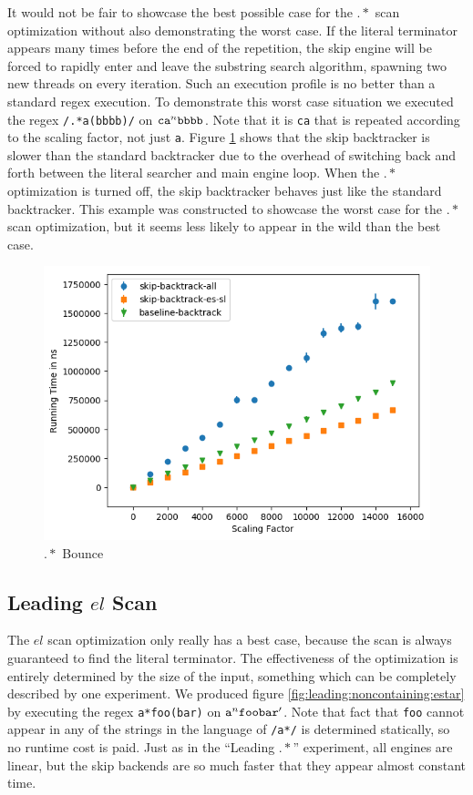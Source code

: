 It would not be fair to showcase the best possible case for the
$.*$ scan optimization without also demonstrating the worst
case. If the literal terminator appears many times before the
end of the repetition, the skip engine will be forced to
rapidly enter and leave the substring search algorithm, spawning
two new threads on every iteration. Such an execution profile
is no better than a standard regex execution.
To demonstrate this worst case situation we executed
the regex \verb'/.*a(bbbb)/' on ${\tt ca}^n{\tt bbbb}$. Note
that it is \verb'ca' that is repeated according to the scaling factor,
not just \verb'a'. Figure \ref{fig:dotstar:bounce}
shows that the skip backtracker is slower than the standard
backtracker due to the overhead of switching back and forth between the
literal searcher and main engine loop. When the $.*$ optimization is
turned off, the skip backtracker behaves just like the standard
backtracker. This example was constructed to showcase the worst
case for the $.*$ scan optimization, but it seems less likely to appear
in the wild than the best case.

\begin{figure}
\caption{$.*$ Bounce}
\label{fig:dotstar:bounce}

\includegraphics{resources/dotstar-bounce.png}
\end{figure}

\subsection{Leading $el$ Scan}

The $el$ scan optimization only really has a best case, because
the scan is always guaranteed to find the literal terminator. The
effectiveness of the optimization is entirely determined by the
size of the input, something which can be completely described
by one experiment. We produced figure \ref{fig:leading:noncontaining:estar}
by executing the regex \verb'a*foo(bar)' on ${\tt a}^n{\tt foobar}'$.
Note that fact that \verb'foo' cannot appear in any of the strings
in the language of \verb'/a*/' is determined statically, so no
runtime cost is paid. Just as in the ``Leading $.*$'' experiment,
all engines are linear, but the skip backends are so much faster that
they appear almost constant time.

